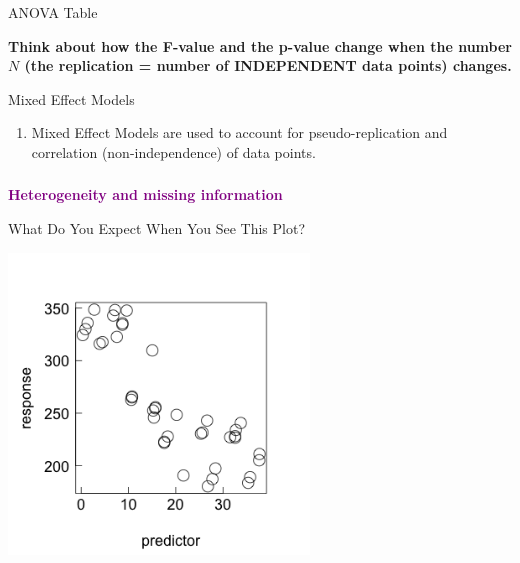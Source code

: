\documentclass{beamer}
\begin{document}
\begin{frame}{ANOVA Table}

  \vspace{0.5cm}
  \textbf{Think about how the F-value and the p-value change when the number \(N\) (the replication = number of INDEPENDENT data points) changes.}
\end{frame}

\begin{frame}{Mixed Effect Models}
  \begin{enumerate}
      \item Mixed Effect Models are used to account for pseudo-replication and correlation (non-independence) of data points.
      \end{enumerate}
\end{frame}

\begin{frame}
  \frametitle{}
  \begin{center}
    \huge\textbf{\textcolor{purple}{Heterogeneity and missing information}}
  \end{center}
\end{frame}

\begin{frame}{What Do You Expect When You See This Plot?}
  \begin{center}
    \includegraphics[width=0.6\textwidth]{lectures/day_1_intro_to_mems/figures/unnamed-chunk-8-1.png} %
  \end{center}
\end{frame}
\end{document}

